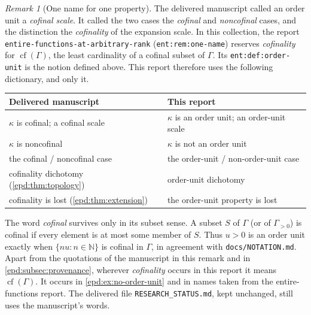 \documentclass[11pt,a4paper]{article}
\numberwithin{equation}{section}
\theoremstyle{plain}
\theoremstyle{definition}
\theoremstyle{remark}
\newtheorem{remark}[remark]{Remark}
\newcommand{\N}{\mathbb N}
\begin{document}
\begin{remark}[One name for one property]\label{epd:rem:one-name}
The delivered manuscript called an order unit a \emph{cofinal scale}. It
called the two cases the \emph{cofinal} and \emph{noncofinal} cases, and
the distinction the \emph{cofinality} of the expansion scale. In this
collection, the report \texttt{entire-functions-\allowbreak at-arbitrary-rank}
(\texttt{ent:rem:one-name}) reserves \emph{cofinality} for
$\operatorname{cf}(\Gamma)$, the least cardinality of a cofinal subset of
$\Gamma$. Its \texttt{ent:def:order-unit} is the notion defined above.
This report therefore uses the following dictionary, and only it.
\begin{center}\small
\begin{tabular}{@{}ll@{}}
\toprule
Delivered manuscript & This report\\\midrule
$\kappa$ is cofinal; a cofinal scale & $\kappa$ is an order unit; an order-unit scale\\
$\kappa$ is noncofinal & $\kappa$ is not an order unit\\
the cofinal / noncofinal case & the order-unit / non-order-unit case\\
cofinality dichotomy (\cref{epd:thm:topology}) & order-unit dichotomy\\
cofinality is lost (\cref{epd:thm:extension}) & the order-unit property is lost\\
\bottomrule
\end{tabular}
\end{center}
The word \emph{cofinal} survives only in its subset sense. A subset
$S$ of $\Gamma$ (or of $\Gamma_{>0}$) is cofinal if every element is at
most some member of $S$. Thus $u>0$ is an
order unit exactly when $\{nu:n\in\N\}$ is cofinal in $\Gamma$, in agreement
with \texttt{docs/NOTATION.md}. Apart from the quotations of the
manuscript in this remark and in \cref{epd:subsec:provenance}, wherever
\emph{cofinality} occurs in this report it means
$\operatorname{cf}(\Gamma)$. It occurs in \cref{epd:ex:no-order-unit} and
in names taken from the entire-functions report. The delivered file \texttt{RESEARCH\_STATUS.md}, kept unchanged, still uses
the manuscript's words.
\end{remark}
\end{document}
